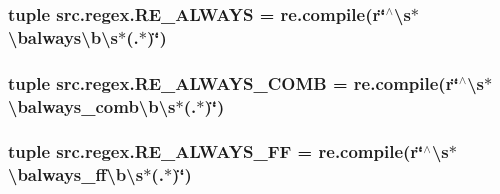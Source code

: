 \hypertarget{namespacesrc_1_1regex_a7b588c9948b4e0eda1a9c08589121230}{
\subsubsection[{R\-E\-\_\-\-A\-L\-W\-A\-Y\-S}]{\setlength{\rightskip}{0pt plus 5cm}tuple src.\-regex.\-R\-E\-\_\-\-A\-L\-W\-A\-Y\-S = re.\-compile(r\char`\"{}$^\wedge$\textbackslash{}s$\ast$\textbackslash{}balways\textbackslash{}b\textbackslash{}s$\ast$(.$\ast$)\char`\"{})}}\label{namespacesrc_1_1regex_a7b588c9948b4e0eda1a9c08589121230}
\hypertarget{namespacesrc_1_1regex_aeac24fb2b4718937029f9f4109341377}{
\subsubsection[{R\-E\-\_\-\-A\-L\-W\-A\-Y\-S\-\_\-\-C\-O\-M\-B}]{\setlength{\rightskip}{0pt plus 5cm}tuple src.\-regex.\-R\-E\-\_\-\-A\-L\-W\-A\-Y\-S\-\_\-\-C\-O\-M\-B = re.\-compile(r\char`\"{}$^\wedge$\textbackslash{}s$\ast$\textbackslash{}balways\-\_\-comb\textbackslash{}b\textbackslash{}s$\ast$(.$\ast$)\char`\"{})}}\label{namespacesrc_1_1regex_aeac24fb2b4718937029f9f4109341377}
\hypertarget{namespacesrc_1_1regex_a3eee15ff85556bd4bcb71975090c2094}{
\subsubsection[{R\-E\-\_\-\-A\-L\-W\-A\-Y\-S\-\_\-\-F\-F}]{\setlength{\rightskip}{0pt plus 5cm}tuple src.\-regex.\-R\-E\-\_\-\-A\-L\-W\-A\-Y\-S\-\_\-\-F\-F = re.\-compile(r\char`\"{}$^\wedge$\textbackslash{}s$\ast$\textbackslash{}balways\-\_\-ff\textbackslash{}b\textbackslash{}s$\ast$(.$\ast$)\char`\"{})}}\label{namespacesrc_1_1regex_a3eee15ff85556bd4bcb71975090c2094}
